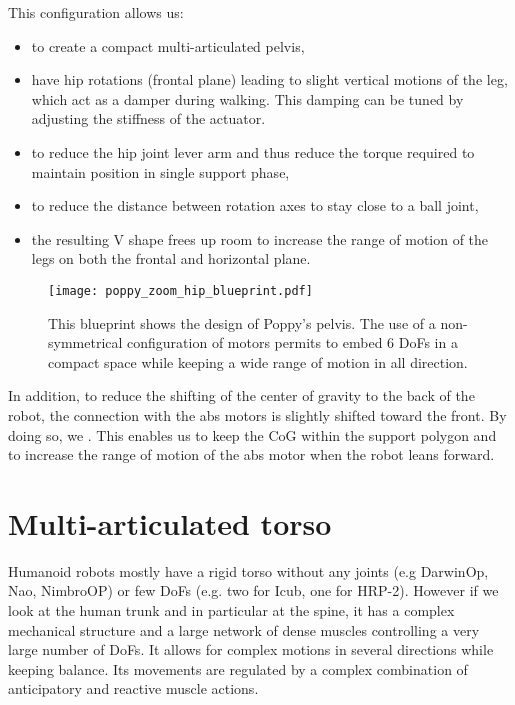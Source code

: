 This configuration allows us:

\begin{itemize}
    \item to create a compact multi-articulated pelvis,
    \item have hip rotations (frontal plane) leading to slight vertical motions of the leg, which act as a damper during walking. This damping can be tuned by adjusting the stiffness of the actuator.
    \item to reduce the hip joint lever arm and thus reduce the torque required to maintain position in single support phase,
    \item to reduce the distance between rotation axes to stay close to a ball joint,
    \item the resulting V shape frees up room to increase the range of motion of the legs on both the frontal and horizontal plane.
\end{itemize}

\begin{figure}[p]
    \begin{center}
        \texttt{[image: poppy\_zoom\_hip\_blueprint.pdf]}
    \end{center}
    \caption{This blueprint shows the design of Poppy's pelvis. The use of a non-symmetrical configuration of motors permits to embed 6 DoFs in a compact space while keeping a wide range of motion in all direction.}
    \label{fig:poppy_zoom_hip_blueprint}
\end{figure}

In addition, to reduce the shifting of the center of gravity to the back of the robot, the connection with the abs motors is slightly shifted toward the front. By doing so, we .
This enables us to keep the CoG within the support polygon and to increase the range of motion of the abs motor when the robot leans forward.


\section{Multi-articulated torso} %

Humanoid robots mostly have a rigid torso without any joints (e.g DarwinOp, Nao, NimbroOP) or few DoFs (e.g. two for Icub, one for HRP-2). However if we look at the human trunk and in particular at the spine, it has a complex mechanical structure and a large network of dense muscles controlling a very large number of DoFs. It allows for complex motions in several directions while keeping balance. Its movements are regulated by a complex combination of anticipatory and reactive muscle actions.

